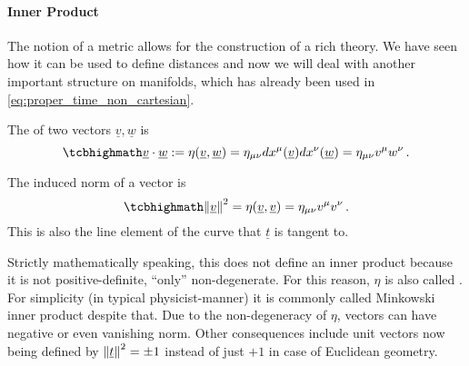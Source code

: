 \documentclass[relativity_main.tex]{subfiles}
\begin{document}
			\paragraph{Inner Product}
The notion of a metric allows for the construction of a rich theory. We have seen how it can be used to define distances and now we will deal with another important structure on manifolds, which has already been used in \eqref{eq:proper_time_non_cartesian}.

\begin{defi}
The  of two vectors $\underline{v}, \underline{w}$ is
\begin{equation}\label{eq:inner_prod}
	\eqbox{
	\underline{v} \cdot \underline{w} := \eta(\underline{v}, \underline{w}) = \eta_{\mu \nu} dx^\mu(\underline{v}) dx^\nu(\underline{w}) = \eta_{\mu \nu} v^\mu w^\nu
	} \, .
\end{equation}

The induced norm of a vector is
\begin{equation}\label{eq:vector_norm}
	\eqbox{
	\norm{\underline{v}}^2 = \eta(\underline{v}, \underline{v}) = \eta_{\mu \nu} v^\mu v^\nu
	} \, .
\end{equation}
This is also the line element of the curve that $\underline{t}$ is tangent to.
\iffalse
Based on that, a general way to define the distance between events $E_1$ at $\underline{x_1} = (ct_1, x_1, y_1, z_1)$ and $E_2$ at $\underline{x_2} = (ct_2, x_2, y_2, z_2)$ in an inertial Cartesian frame is
\begin{equation}
	\eqbox{
	\begin{split}
	d(E_1, E_2) &= \sqrt{(x_2 - x_1)^2 + (y_2 - y_1)^2 + (z_2 - z_1)^2 - c^2 (t_2 - t_1)^2}
	\\
	&= c \, \sqrt{- \tau_{E_1, E_2}^2} = \eta_{\mu \nu} (x_1^\mu - x_2^\mu) (x_1^\nu - x_2^\nu)
	\\
	&= \min_{\Gamma: \; \Gamma(a) = E_1, \Gamma(b) = E_2} L(\Gamma)
	= \min_{\Gamma: \; \Gamma(a) = E_1, \Gamma(b) = E_2} \int_\Gamma ds
	\end{split}
	}
\end{equation}
i.e.~as the (proper) length of the straight world line connecting them.
\fi
\end{defi}
Strictly mathematically speaking, this does not define an inner product because it is not positive-definite, \enquote{only} non-degenerate. For this reason, $\eta$ is also called . For simplicity (in typical physicist-manner) it is commonly called Minkowski inner product despite that. Due to the non-degeneracy of $\eta$, vectors can have negative or even vanishing norm. Other consequences include unit vectors now being defined by $\norm{\underline{t}}^2 = \pm 1$ instead of just $+ 1$ in case of Euclidean geometry.
\end{document}
